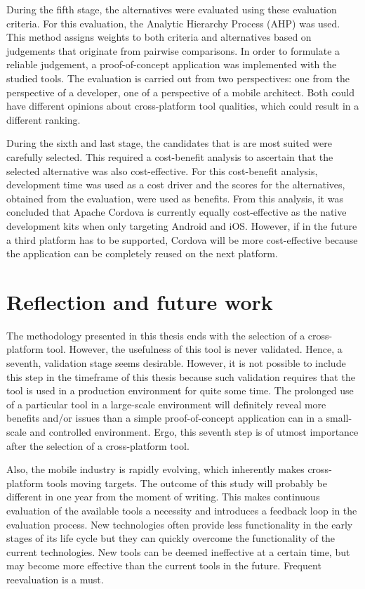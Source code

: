 During the fifth stage, the alternatives were evaluated using these evaluation criteria. For this evaluation, the Analytic Hierarchy Process (AHP) \cite{Saaty:1980} was used. This method assigns weights to both criteria and alternatives based on judgements that originate from pairwise comparisons. In order to formulate a reliable judgement, a proof-of-concept application was implemented with the studied tools. The evaluation is carried out from two perspectives: one from the perspective of a developer, one of a perspective of a mobile architect. Both could have different opinions about cross-platform tool qualities, which could result in a different ranking.

During the sixth and last stage, the candidates that is are most suited were carefully selected. This required a cost-benefit analysis to ascertain that the selected alternative was also cost-effective. For this cost-benefit analysis, development time was used as a cost driver and the scores for the alternatives, obtained from the evaluation, were used as benefits. From this analysis, it was concluded that Apache Cordova is currently equally cost-effective as the native development kits when only targeting Android and iOS. However, if in the future a third platform has to be supported, Cordova will be more cost-effective because the application can be completely reused on the next platform.

\section{Reflection and future work}
\label{sec:reflection}

The methodology presented in this thesis ends with the selection of a cross-platform tool. However, the usefulness of this tool is never validated. Hence, a seventh, validation stage seems desirable. However, it is not possible to include this step in the timeframe of this thesis because such validation requires that the tool is used in a production environment for quite some time. The prolonged use of a particular tool in a large-scale environment will definitely reveal more benefits and/or issues than a simple proof-of-concept application can in a small-scale and controlled environment. Ergo, this seventh step is of utmost importance after the selection of a cross-platform tool.

Also, the mobile industry is rapidly evolving, which inherently makes cross-platform tools moving targets. The outcome of this study will probably be different in one year from the moment of writing. This makes continuous evaluation of the available tools a necessity and introduces a feedback loop in the evaluation process. New technologies often provide less functionality in the early stages of its life cycle but they can quickly overcome the functionality of the current technologies. New tools can be deemed ineffective at a certain time, but may become more effective than the current tools in the future. Frequent reevaluation is a must.

